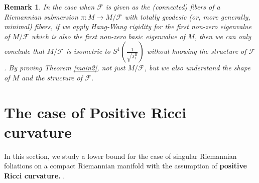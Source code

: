 \documentclass[11pt]{amsart}
\newtheorem{remark}[prop]{Remark}
\def\d{\mathrm{d}}
\begin{document}




\begin{remark}
    In the case when $\mathcal{F}$ is given as the (connected) fibers of a Riemannian submersion $\pi:M\to M/\mathcal{F}$ with totally geodesic (or, more generally, minimal) fibers, if we apply Hang-Wang rigidity for the first non-zero eigenvalue of $M/\mathcal{F}$ which is also the first non-zero basic eigenvalue of $M$, then 
     we can only conclude that $M/\mathcal{F}$ is isometric to $S^1\left(\frac{1}{\sqrt{\lambda_1^B}}\right)$ without knowing the structure of $\mathcal{F}$. By proving Theorem \ref{main2}, not just $M/\mathcal{F}$, but we also understand the shape of $M$ and the structure of $\mathcal{F}$.
\end{remark}


\section{The case of Positive Ricci curvature}\label{1111}

In this section, we study a lower bound for the case of singular Riemannian foliations on a compact Riemannian manifold with the assumption of\textbf{ positive Ricci curvature. }.
\end{document}
